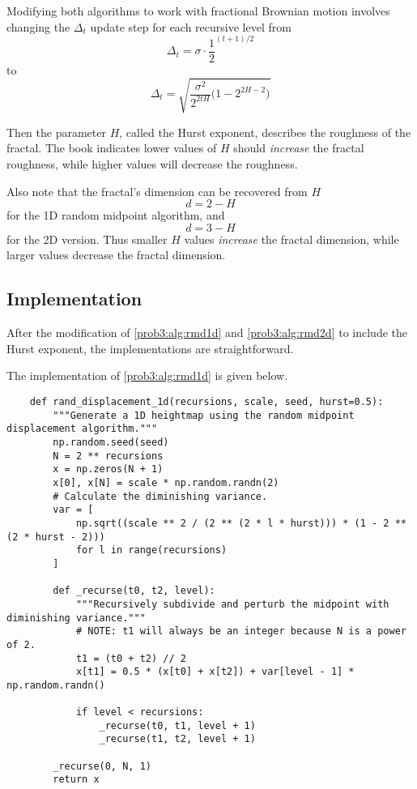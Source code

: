 Modifying both algorithms to work with fractional Brownian motion involves changing the $\Delta_t$ update step for each recursive level from
\begin{equation}
    \Delta_t = \sigma \cdot \frac{1}{2}^{(t + 1) / 2}\label{prob3:eqn:rmd-Delta}
\end{equation}
to
\begin{equation}
    \Delta_t = \sqrt{\frac{\sigma^2}{2^{2tH}} \big(1 - 2 ^ {2 H - 2}\big)}\label{prob3:eqn:fBm-Delta}
\end{equation}

Then the parameter $H$, called the Hurst exponent, describes the roughness of the fractal.
The book indicates lower values of $H$ should \textit{increase} the fractal roughness, while higher values will decrease the roughness.

Also note that the fractal's dimension can be recovered from $H$
\begin{equation}
    d = 2 - H\label{prob3:eqn:fractal-dimension-1d}
\end{equation}
for the 1D random midpoint algorithm, and
\begin{equation}
    d = 3 - H\label{prob3:eqn:fractal-dimension-2d}
\end{equation}
for the 2D version.
Thus smaller $H$ values \textit{increase} the fractal dimension, while larger values decrease the fractal dimension.

\subsection{Implementation}
After the modification of \autoref{prob3:alg:rmd1d} and \autoref{prob3:alg:rmd2d} to include the Hurst exponent, the implementations are straightforward.

The implementation of \autoref{prob3:alg:rmd1d} is given below.

\begin{verbatim}
    def rand_displacement_1d(recursions, scale, seed, hurst=0.5):
        """Generate a 1D heightmap using the random midpoint displacement algorithm."""
        np.random.seed(seed)
        N = 2 ** recursions
        x = np.zeros(N + 1)
        x[0], x[N] = scale * np.random.randn(2)
        # Calculate the diminishing variance.
        var = [
            np.sqrt((scale ** 2 / (2 ** (2 * l * hurst))) * (1 - 2 ** (2 * hurst - 2)))
            for l in range(recursions)
        ]

        def _recurse(t0, t2, level):
            """Recursively subdivide and perturb the midpoint with diminishing variance."""
            # NOTE: t1 will always be an integer because N is a power of 2.
            t1 = (t0 + t2) // 2
            x[t1] = 0.5 * (x[t0] + x[t2]) + var[level - 1] * np.random.randn()

            if level < recursions:
                _recurse(t0, t1, level + 1)
                _recurse(t1, t2, level + 1)

        _recurse(0, N, 1)
        return x
\end{verbatim}

